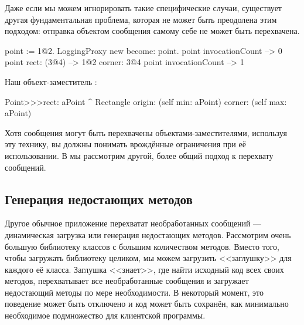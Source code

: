 \documentclass[a4paper,10pt,twoside]{book}
\begin{document}
Даже если мы можем игнорировать такие специфические случаи, существует другая фундаментальная проблема, которая не может быть преодолена этим подходом: отправка объектом сообщения самому себе не может быть перехвачена.
\begin{code}{}
point := 1@2.
LoggingProxy new become: point.
point invocationCount --> 0
point rect: (3@4)        --> 1@2 corner: 3@4
point invocationCount --> 1
\end{code}

Наш объект-заместитель :
\begin{code}{}
Point>>>rect: aPoint 
	^ Rectangle  origin: (self min: aPoint) corner: (self max: aPoint)
\end{code}

Хотя сообщения могут быть перехвачены объектами-заместителями, используя эту технику, вы должны понимать врождённые ограничения при её использовании. В  мы рассмотрим другой, более общий подход к перехвату сообщений.

\subsection{Генерация недостающих методов}

Другое обычное приложение перехватат необработанных сообщений --- динамическая загрузка или генерация недостающих методов.
Рассмотрим очень большую библиотеку классов с большим количеством методов. Вместо того, чтобы загружать библиотеку целиком, мы можем загрузить <<заглушку>> для каждого её класса. Заглушка <<знает>>, где найти исходный код всех своих методов, перехватывает все необработанные сообщения и загружает недостающий методы по мере необходимости. В некоторый момент, это поведение может быть отключено и код может быть сохранён, как минимально необходимое подмножество для клиентской программы.
\end{document}
